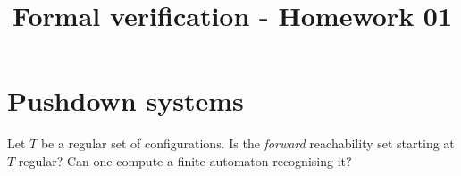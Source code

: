 

\title{Formal verification - Homework 01}



\maketitle

\section*{Pushdown systems}

\begin{exercise}
	Let $T$ be a regular set of configurations.
	Is the \emph{forward} reachability set starting at $T$ regular?
	Can one compute a finite automaton recognising it?
\end{exercise}


